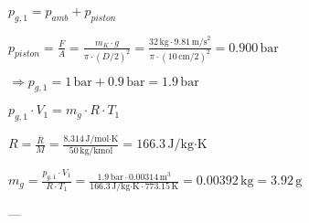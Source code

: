 \( p_{g,1} = p_{amb} + p_{piston} \)  

\( p_{piston} = \frac{F}{A} = \frac{m_K \cdot g}{\pi \cdot (D/2)^2} = \frac{32 \, \text{kg} \cdot 9.81 \, \text{m/s}^2}{\pi \cdot (10 \, \text{cm}/2)^2} = 0.900 \, \text{bar} \)  

\( \Rightarrow p_{g,1} = 1 \, \text{bar} + 0.9 \, \text{bar} = 1.9 \, \text{bar} \)  

\( p_{g,1} \cdot V_1 = m_g \cdot R \cdot T_1 \)  

\( R = \frac{\overline{R}}{M} = \frac{8.314 \, \text{J/mol·K}}{50 \, \text{kg/kmol}} = 166.3 \, \text{J/kg·K} \)  

\( m_g = \frac{p_{g,1} \cdot V_1}{R \cdot T_1} = \frac{1.9 \, \text{bar} \cdot 0.00314 \, \text{m}^3}{166.3 \, \text{J/kg·K} \cdot 773.15 \, \text{K}} = 0.00392 \, \text{kg} = 3.92 \, \text{g} \)  

---